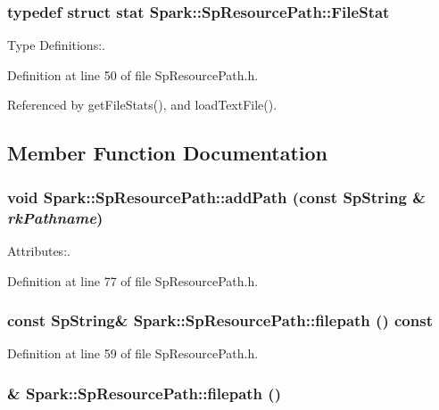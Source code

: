 \subsubsection{\setlength{\rightskip}{0pt plus 5cm}typedef struct stat {\bf Spark::Sp\-Resource\-Path::File\-Stat}}\label{classSpark_1_1SpResourcePath_w0}


Type Definitions:. 

Definition at line 50 of file Sp\-Resource\-Path.h.

Referenced by get\-File\-Stats(), and load\-Text\-File().

\subsection{Member Function Documentation}
\subsubsection{\setlength{\rightskip}{0pt plus 5cm}void Spark::Sp\-Resource\-Path::add\-Path (const {\bf Sp\-String} \& {\em rk\-Pathname})\hspace{0.3cm}{\tt  [inline]}}\label{classSpark_1_1SpResourcePath_a6}


Attributes:. 

Definition at line 77 of file Sp\-Resource\-Path.h.
\subsubsection{\setlength{\rightskip}{0pt plus 5cm}const {\bf Sp\-String}\& Spark::Sp\-Resource\-Path::filepath () const\hspace{0.3cm}{\tt  [inline]}}\label{classSpark_1_1SpResourcePath_a1}


Definition at line 59 of file Sp\-Resource\-Path.h.
\subsubsection{\& Spark::Sp\-Resource\-Path::filepath ()\hspace{0.3cm}{\tt  [inline]}}\label{classSpark_1_1SpResourcePath_a0}


